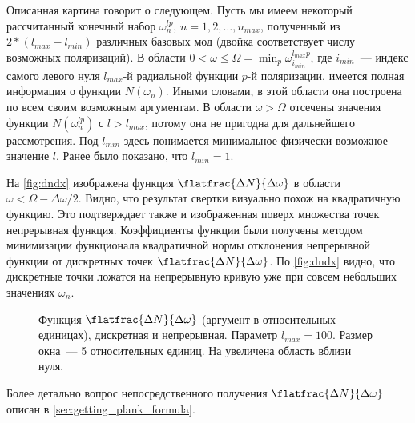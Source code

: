     Описанная картина говорит о следующем. Пусть мы имеем некоторый рассчитанный конечный набор $\omega^{lp}_n$, $n = 1, 2, \dots, n_{max}$, полученный из $2 * (l_{max} - l_{min})$ различных базовых мод (двойка соответствует числу возможных поляризаций). В области $0 < \omega \le \Omega = \min_p{\omega^{l_{max}p}_{i_{min}}}$, где $i_{min}$~--- индекс самого левого нуля $l_{max}$-й радиальной функции $p$-й поляризации, имеется полная информация о функции $N(\omega_n)$. Иными словами, в этой области она построена по всем своим возможным аргументам. В области $\omega > \Omega$ отсечены значения функции $N(\omega^{lp}_n)$ с $l > l_{max}$, потому она не пригодна для дальнейшего рассмотрения. Под $l_{min}$ здесь понимается минимальное физически возможное значение $l$. Ранее было показано, что $l_{min} = 1$.

    На \autoref{fig:dndx} изображена функция $\flatfrac{\Delta N}{\Delta \omega}$ в области $\omega < \Omega - \Delta\omega / 2$. Видно, что результат свертки визуально похож на квадратичную функцию. Это подтверждает также и изображенная поверх множества точек непрерывная функция. Коэффициенты функции были получены методом минимизации функционала квадратичной нормы отклонения непрерывной функции от дискретных точек $\flatfrac{\Delta N}{\Delta \omega}$. По \autoref{fig:dndx} видно, что дискретные точки ложатся на непрерывную кривую уже при совсем небольших значениях $\omega_n$.
    \begin{figure}[h]
        \centering
        \hspace{8pt}%
        \hspace{8pt}%
        \caption[]{Функция $\flatfrac{\Delta N}{\Delta \omega}$ (аргумент в относительных единицах), дискретная и непрерывная. Параметр $l_{max} = 100$. Размер окна~--- 5 относительных единиц. На  увеличена область вблизи нуля. %
        } %
        \label{fig:dndx}%
    \end{figure}

    Более детально вопрос непосредственного получения $\flatfrac{\Delta N}{\Delta \omega}$ описан в \autoref{sec:getting_plank_formula}.

